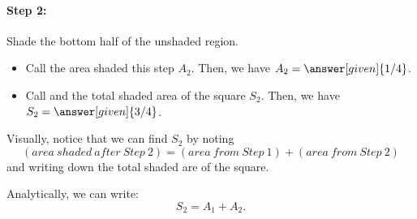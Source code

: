 \documentclass{ximera}
\begin{document}
\paragraph{Step 2:} Shade the bottom half of the unshaded region.  

\begin{image}[1in]
\end{image}

\begin{itemize}
\item Call the area shaded this step $A_2$.  Then, we have $A_2=\answer[given]{1/4}$.
\item Call and the total shaded area  of the square $S_2$.  Then, we have $S_2=\answer[given]{3/4}$.
\end{itemize}

Visually, notice that we can find $S_2$ by noting
$$(area ~ shaded ~ after ~ Step ~ 2) = (area ~ from ~ Step ~ 1) + (area ~ from ~ Step ~ 2)$$
and writing down the total shaded are of the square.

Analytically, we can write: $$S_2=A_1+A_2.$$
\end{document}
